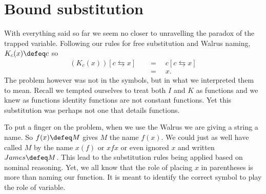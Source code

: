 \section{Bound substitution}
With everything said so far we seem no closer to unravelling the paradox 
of the trapped variable.  Following our rules for free substitution and 
Walrus naming, $K_c(x)\defeq c$ so 
\begin{align*}
    \tag{judgemental equality}
    (K_c(x))[c\leftrightarrows x] 
    &\quad =\quad c[c\leftrightarrows x]\\
    \tag{Free.match}
    & \quad =\quad x.
\end{align*}
The problem however was not in the symbols, but in what we interpreted them 
to mean.  Recall we tempted ourselves to treat both $I$ and $K$ as functions
and we knew as functions identity functions are not constant functions.
Yet this substitution was perhaps not one that details functions.

To put a finger on the problem, when we use the Walrus we are giving 
a string a name.  So $f(x)\defeq M$ gives $M$ the name $f(x)$.  
We could just as well have called $M$ by the name $x(f)$ or $xfx$ or 
even ignored $x$ and written $James\defeq M$.  This lead to the substitution 
rules being applied based on nominal reasoning.  Yet, we all know that 
the role of placing $x$ in parentheses is more than naming our function.
It is meant to identify the correct symbol to play the role of variable.



